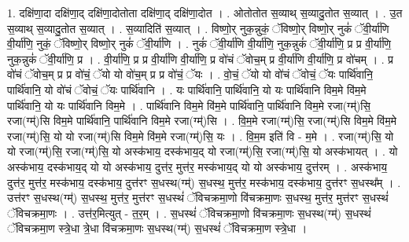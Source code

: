 \documentclass[17pt]{extarticle}
\begin{document}
1. दक्षि॑णा॒दा दक्षि॑णा॒द् दक्षि॑णा॒दोतोता दक्षि॑णा॒द् दक्षि॑णा॒दोत । . ओतोतोत स॒व्याथ् स॒व्यादु॒तोत स॒व्यात् । . उ॒त स॒व्याथ् स॒व्यादु॒तोत स॒व्यात् । . स॒व्यादिति॑ स॒व्यात् । . विष्णो॒र् नुक॒न्नुकं॒ ॅविष्णो॒र् विष्णो॒र् नुकं॑ ॅवी॒र्या॑णि वी॒र्या॑णि॒ नुकं॒ ॅविष्णो॒र् विष्णो॒र् नुकं॑ ॅवी॒र्या॑णि । . नुकं॑ ॅवी॒र्या॑णि वी॒र्या॑णि॒ नुक॒न्नुकं॑ ॅवी॒र्या॑णि॒ प्र प्र वी॒र्या॑णि॒ नुक॒न्नुकं॑ ॅवी॒र्या॑णि॒ प्र । . वी॒र्या॑णि॒ प्र प्र वी॒र्या॑णि वी॒र्या॑णि॒ प्र वो॑चं ॅवोच॒म् प्र वी॒र्या॑णि वी॒र्या॑णि॒ प्र वो॑चम् । . प्र वो॑चं ॅवोच॒म् प्र प्र वो॑चं॒ ॅयो यो वो॑च॒म् प्र प्र वो॑चं॒ ॅयः । . वो॒चं॒ ॅयो यो वो॑चं ॅवोचं॒ ॅयः पार्थि॑वानि॒ पार्थि॑वानि॒ यो वो॑चं ॅवोचं॒ ॅयः पार्थि॑वानि । . यः पार्थि॑वानि॒ पार्थि॑वानि॒ यो यः पार्थि॑वानि विम॒मे वि॑म॒मे पार्थि॑वानि॒ यो यः पार्थि॑वानि विम॒मे । . पार्थि॑वानि विम॒मे वि॑म॒मे पार्थि॑वानि॒ पार्थि॑वानि विम॒मे रजा(ग्म्॑)सि॒ रजा(ग्म्॑)सि विम॒मे पार्थि॑वानि॒ पार्थि॑वानि विम॒मे रजा(ग्म्॑)सि । . वि॒म॒मे रजा(ग्म्॑)सि॒ रजा(ग्म्॑)सि विम॒मे वि॑म॒मे रजा(ग्म्॑)सि॒ यो यो रजा(ग्म्॑)सि विम॒मे वि॑म॒मे रजा(ग्म्॑)सि॒ यः । . वि॒म॒म इति॑ वि - म॒मे । . रजा(ग्म्॑)सि॒ यो यो रजा(ग्म्॑)सि॒ रजा(ग्म्॑)सि॒ यो अस्क॑भाय॒ दस्क॑भाय॒द् यो रजा(ग्म्॑)सि॒ रजा(ग्म्॑)सि॒ यो अस्क॑भायत् । . यो अस्क॑भाय॒ दस्क॑भाय॒द् यो यो अस्क॑भाय॒ दुत्त॑र॒ मुत्त॑र॒ मस्क॑भाय॒द् यो यो अस्क॑भाय॒ दुत्त॑रम् । . अस्क॑भाय॒ दुत्त॑र॒ मुत्त॑र॒ मस्क॑भाय॒ दस्क॑भाय॒ दुत्त॑रꣳ स॒धस्थ(ग्म्॑) स॒धस्थ॒ मुत्त॑र॒ मस्क॑भाय॒ दस्क॑भाय॒ दुत्त॑रꣳ स॒धस्थ᳚म् । . उत्त॑रꣳ स॒धस्थ(ग्म्॑) स॒धस्थ॒ मुत्त॑र॒ मुत्त॑रꣳ स॒धस्थं॑ ॅविचक्रमा॒णो वि॑चक्रमा॒णः स॒धस्थ॒ मुत्त॑र॒ मुत्त॑रꣳ स॒धस्थं॑ ॅविचक्रमा॒णः । . उत्त॑र॒मित्युत् - त॒र॒म् । . स॒धस्थं॑ ॅविचक्रमा॒णो वि॑चक्रमा॒णः स॒धस्थ(ग्म्॑) स॒धस्थं॑ ॅविचक्रमा॒ण स्त्रे॒धा त्रे॒धा वि॑चक्रमा॒णः स॒धस्थ(ग्म्॑) स॒धस्थं॑ ॅविचक्रमा॒ण स्त्रे॒धा । \newline
\end{document}
